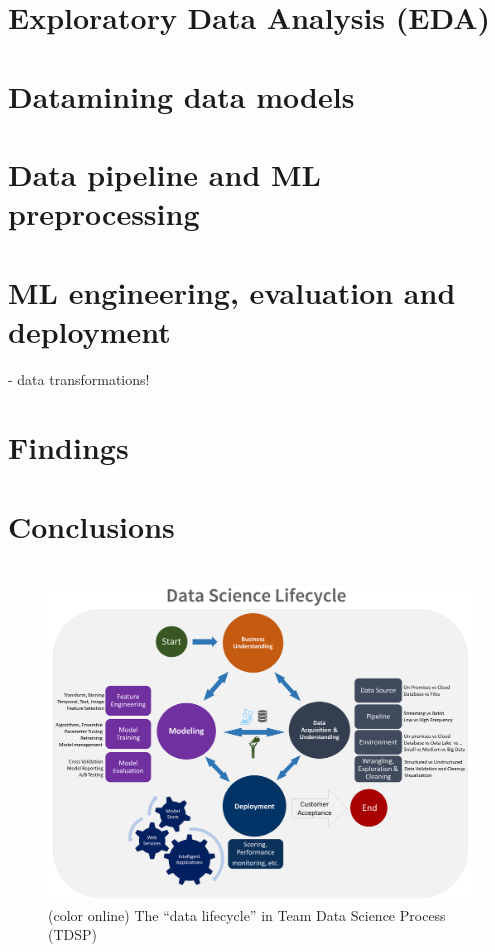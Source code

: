 \documentclass[12pt,letterpaper]{article}
\begin{document}
\section{Exploratory Data Analysis (EDA)}
\tab 

\section{Datamining data models}

\section{Data pipeline and ML preprocessing}
\tab 

\section{ML engineering, evaluation and deployment}
\tab 
- data transformations!

\section{Findings}
\tab 

\section{Conclusions}
\tab 


\pagebreak
\section*{}


\begin{figure}[h!]
  \centering
    \includegraphics[width=1.0\linewidth]{../img/TDSP_Data_Science_Lifecycle.png}
    \caption{(color online) The ``data lifecycle'' in Team Data Science Process (TDSP)}
    \label{fig:tdsp}
  \end{figure}


\clearpage
\section*{}

\center{}
\end{document}
